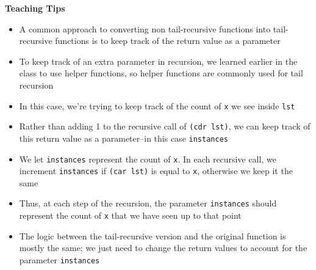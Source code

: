 \begin{guide}
\begin{blocksection}
\textbf{Teaching Tips}
  \begin{itemize}
    \item A common approach to converting non tail-recursive functions into tail-recursive functions is to keep track of the return value as a parameter
    \item To keep track of an extra parameter in recursion, we learned earlier in the class to use helper functions, so helper functions are commonly used for tail recursion
    \item In this case, we're trying to keep track of the count of \lstinline{x} we see inside \lstinline{lst}
    \item Rather than adding 1 to the recursive call of \lstinline{(cdr lst)}, we can keep track of this return value as a parameter--in this case \lstinline{instances}
    \item We let \lstinline{instances} represent the count of \lstinline{x}. In each recursive call, we increment \lstinline{instances} if \lstinline{(car lst)} is equal to \lstinline{x}, otherwise we keep it the same
    \item Thus, at each step of the recursion, the parameter \lstinline{instances} should represent the
    count of \lstinline{x} that we have seen up to that point
    \item The logic between the tail-recursive version and the original function is mostly the same; we just need to change the return values to account for the parameter \lstinline{instances}
  \end{itemize}
\end{blocksection}
\end{guide}
